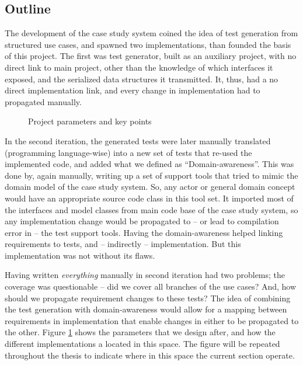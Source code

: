 \subsection{Outline}
The development of the case study system coined the idea of test generation from structured use cases, and spawned two implementations, than founded the basis of this project. The first was test generator, built as an auxiliary project, with no direct link to main project, other than the knowledge of which interfaces it exposed, and the serialized data structures it transmitted. It, thus, had a no direct implementation link, and every change in implementation had to propagated manually.\medskip
\begin{figure}[!htbp]
\centering
{}
\caption{Project parameters and key points}
\label{fig:project_parameter_plot}
\end{figure}
\noindent In the second iteration, the generated tests were later manually translated (programming language-wise) into a new set of tests that re-used the implemented code, and added what we defined as ``Domain-awareness''. This was done by, again manually, writing up a set of support tools that tried to mimic the domain model of the case study system. So, any actor or general domain concept would have an appropriate source code class in this tool set. It imported most of the interfaces and model classes from main code base of the case study system, so any implementation change would be propagated to -- or lead to compilation error in -- the test support tools. Having the domain-awareness helped linking requirements to tests, and -- indirectly -- implementation. But this implementation was not without its flaws.\medskip

\noindent Having written \emph{everything} manually in second iteration had two problems; the coverage was questionable -- did we cover all branches of the use cases? And, how should we propagate requirement changes to these tests? The idea of combining the test generation with domain-awareness would allow for a mapping between requirements in implementation that enable changes in either to be propagated to the other. Figure \ref{fig:project_parameter_plot} shows the parameters that we design after, and how the different implementations a located in this space. The figure will be repeated throughout the thesis to indicate where in this space the current section operate.

